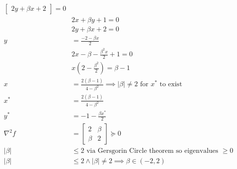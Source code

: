 \documentclass[12pt,letter]{article}
\begin{document}
\begin{enumerate}
\begin{align*}
\begin{bmatrix}
                 2y + \beta x +2
               \end{bmatrix} = 0\\
    &2x + \beta y + 1 = 0\\
    &2y + \beta x + 2 = 0\\
    y &= \frac{-2 - \beta x}{2}\\
    & 2x - \beta - \frac{\beta^2 x}{2} + 1 = 0\\
    & x(2-\frac{\beta^2}{2}) = \beta - 1\\
    x & = \frac{2(\beta-1)}{4-\beta^2} \implies |\beta| \neq 2 \text{ for }x^* \text{ to exist}\\
    x^* &= \frac{2(\beta-1)}{4-\beta^2}\\
    y^* &= -1 - \frac{\beta x^*}{2}\\
    \nabla^2 f & =
               \begin{bmatrix}
                 2 & \beta\\
                 \beta & 2
               \end{bmatrix} \succeq 0\\
    |\beta| & \leq 2 \text{ via Gersgorin Circle theorem so eigenvalues } \geq 0\\
    |\beta| & \leq 2 \wedge |\beta| \neq 2 \implies \beta \in (-2,2)\\
  \end{align*}
  

\end{enumerate}
\end{document}
